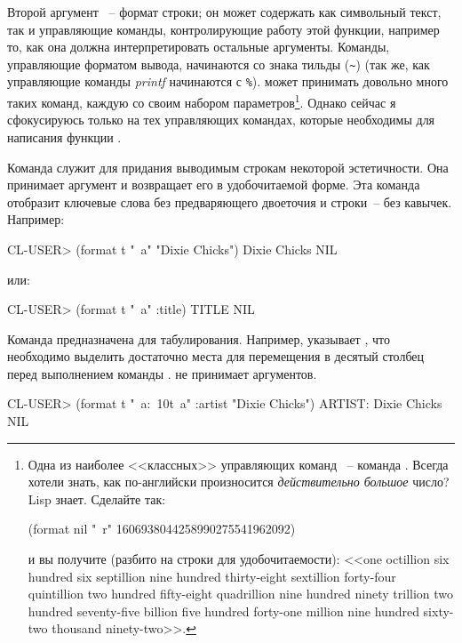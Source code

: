 Второй аргумент ~-- формат строки; он может содержать как символьный текст,
так и управляющие команды, контролирующие работу этой функции, например то, как она должна
интерпретировать остальные аргументы. Команды, управляющие форматом вывода, начинаются со
знака тильды (\lstinline!~!) (так же, как управляющие команды \textit{printf} начинаются с
\lstinline{%}).  может принимать довольно много таких команд, каждую со
своим набором параметров\footnote{Одна из наиболее <<классных>> управляющих команд
  ~-- команда . Всегда хотели знать, как по-английски произносится
  \textit{действительно большое} число? Lisp знает. Сделайте так:

\begin{myverb}
(format nil "~r" 1606938044258990275541962092)
\end{myverb}

\noindent{}и вы получите (разбито на строки для удобочитаемости): <<one octillion six hundred six
septillion nine hundred thirty-eight sextillion forty-four quintillion two hundred
fifty-eight quadrillion nine hundred ninety trillion two hundred seventy-five billion five
hundred forty-one million nine hundred sixty-two thousand ninety-two>>.}. Однако сейчас я
сфокусируюсь только на тех управляющих командах, которые необходимы для написания функции
.

Команда  служит для придания выводимым строкам некоторой эстетичности. Она
принимает аргумент и возвращает его в удобочитаемой форме. Эта команда отобразит ключевые
слова без предваряющего двоеточия и строки~-- без кавычек. Например:

\begin{myverb}
  CL-USER> (format t "~a" "Dixie Chicks")
  Dixie Chicks
  NIL
\end{myverb}

\noindent{}или:

\begin{myverb}
  CL-USER> (format t "~a" :title)
  TITLE
  NIL
\end{myverb}

Команда  предназначена для табулирования. Например,  указывает
, что необходимо выделить достаточно места для перемещения в десятый столбец
перед выполнением команды .  не принимает аргументов.

\begin{myverb}
  CL-USER> (format t "~a:~10t~a" :artist "Dixie Chicks")
  ARTIST:   Dixie Chicks
  NIL
\end{myverb}

